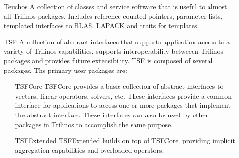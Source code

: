 \begin{itemize}
\begin{itemize}
\end{itemize}

\item[Teuchos] A collection of classes and service software that is
useful to almost all Trilinos packages.  Includes
reference-counted pointers, parameter lists, templated interfaces to
BLAS, LAPACK and traits for templates.  

\item[TSF] A collection of abstract interfaces that supports application
access to a variety of Trilinos capabilities, supports
interoperability betweeen Trilinos packages and provides future extensibility.
TSF is composed of several packages.  The primary user packages are:  
\begin{itemize}

\item[TSFCore] TSFCore provides 
a basic collection of abstract interfaces to vectors, linear
operators, solvers, etc.  These interfaces provide a common
interface for applications to access one or more packages that
implement the abstract interface.  These interfaces can also be used
by other packages in Trilinos to accomplish the same purpose.

\item[TSFExtended] TSFExtended builds on top of TSFCore, providing implicit
aggregation capabilities and overloaded operators.  
\end{itemize}
\end{itemize}

